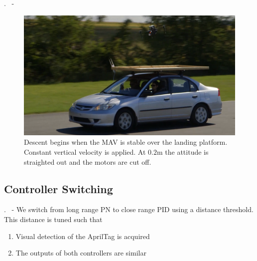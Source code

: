 
\begin{frame}{\thesection. \insertsection \ - \insertsubsection}
	\begin{figure}
		\includegraphics[width=0.7\paperwidth]{figures/landing.png}
		\caption{Descent begins when the MAV is stable over the landing platform. Constant vertical 
		velocity is applied. At $0.2$m the attitude is straighted out and the motors are cut off.}
	\end{figure}
\end{frame}



\subsection{Controller Switching}
\begin{frame}{\thesection. \insertsection \ - \insertsubsection}
	We switch from long range PN to close range PID using a distance threshold. This distance
	is tuned such that
	\begin{enumerate}
		\item Visual detection of the AprilTag is acquired
		\item The outputs of both controllers are similar
	\end{enumerate}
	
\end{frame}

